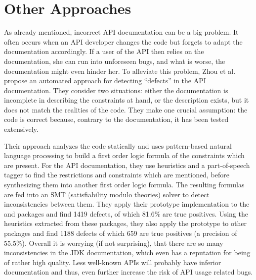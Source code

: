 
\section{Other Approaches}

As already mentioned, incorrect API documentation can be a big problem.
It often occurs when an API developer changes the code but forgets to adapt the documentation accordingly.
If a user of the API then relies on the documentation, she can run into unforeseen bugs, and what is worse, the documentation might even hinder her.
To alleviate this problem, Zhou et al.  \cite{zhou2017analyzing} propose an automated approach for detecting ``defects'' in the API documentation.
They consider two situations: either the documentation is incomplete in describing the constraints at hand, or the description exists, but it does not match the realities of the code.
They make one crucial assumption: the code is correct because, contrary to the documentation, it has been tested extensively.

Their approach analyzes the code statically and uses pattern-based natural language processing to build a first order logic formula of the constraints which are present.
For the API documentation, they use heuristics and a part-of-speech tagger to find the restrictions and constraints which are mentioned, before synthesizing them into another first order logic formula.
The resulting formulas are fed into an SMT (satisfiability modulo theories) solver \cite{barrett2009satisfiability} to detect inconsistencies between them.
They apply their prototype implementation to the  and  packages and find 1419 defects, of which 81.6\% are true positives.
Using the heuristics extracted from these packages, they also apply the prototype to other packages and find 1188 defects of which 659 are true positives (a precision of 55.5\%).
Overall it is worrying (if not surprising), that there are so many inconsistencies in the JDK documentation, which even has a reputation for being of rather high quality.
Less well-known APIs will probably have inferior documentation and thus, even further increase the risk of API usage related bugs.

